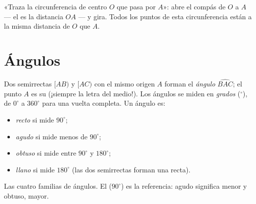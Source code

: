 \begin{example}\label{ex:g6:lines:circle}
«Traza la circunferencia de centro $O$ que pasa por $A$»: abre el compás
de $O$ a $A$ --- el  es la distancia $OA$ --- y gira. Todos los
puntos de esta circunferencia están a la misma distancia de $O$ que $A$.
\end{example}

\section{Ángulos}

\begin{definition}[Ángulo]\label{def:g6:lines:angle}
Dos semirrectas $[AB)$ y $[AC)$ con el mismo origen $A$ forman el
\emph{ángulo} $\widehat{BAC}$; el punto $A$ es su
\emph{} (¡siempre la letra del medio!). Los ángulos se miden en
\emph{grados} ($^\circ$), de $0^\circ$ a $360^\circ$ para una vuelta
completa. Un ángulo es:
\begin{itemize}
  \item \emph{recto} si mide $90^\circ$;
  \item \emph{agudo} si mide menos de $90^\circ$;
  \item \emph{obtuso} si mide entre $90^\circ$ y
        $180^\circ$;
  \item \emph{llano} si mide $180^\circ$ (las dos semirrectas forman
        una recta).
\end{itemize}
\end{definition}

\begin{omfigure}

{\small Las cuatro familias de ángulos. El  ($90^\circ$) es
la referencia: agudo significa menor y obtuso, mayor.}
\end{omfigure}

